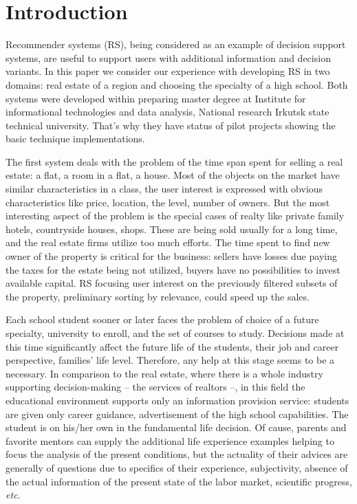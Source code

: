 \documentclass[conference]{IEEEtran}
\begin{document}
\section{Introduction}

Recommender systems (RS), being considered as an example of decision support systems, are useful to support users with additional information and decision variants.  In this paper we consider our experience with developing RS in two domains: real estate of a region and choosing the specialty of a high school.  Both systems were developed within preparing master degree at Institute for informational technologies and data analysis, National research Irkutsk state technical university.  That's why they have status of pilot projects showing the basic technique implementations.

The first system deals with the problem of the time span spent for selling a real estate: a flat, a room in a flat, a house.  Most of the objects on the market have similar characteristics in a class, the user interest is expressed with obvious characteristics like price, location, the level, number of owners.  But the most interesting aspect of the problem is the special cases of realty like private family hotels, countryside houses, shops.  These are being sold usually for a long time, and the real estate firms utilize too much efforts.  The time spent to find new owner of the property is critical for the business: sellers have losses due paying the taxes for the estate being not utilized, buyers have no possibilities to invest available capital.   RS focusing user interest on the previously filtered subsets of the property, preliminary sorting by relevance, could speed up the sales.

Each school student sooner or later faces the problem of choice of a future specialty, university to enroll, and the set of courses to study.  Decisions made at this time significantly affect the future life of the students, their job and career perspective, families' life level.  Therefore, any help at this stage seems to be a necessary. In comparison to the real estate, where there is a whole industry supporting decision-making -- the services of realtors --, in this field the educational environment supports only an information provision service: students are given only career guidance, advertisement of the high school capabilities.  The student is on his/her own in the fundamental life decision.  Of cause, parents and favorite mentors can supply the additional life experience examples helping to focus the analysis of the present conditions, but the actuality of their advices are generally of questions due to specifics of their experience, subjectivity, absence of the actual information of the present state of the labor market, scientific progress, \emph{etc}.
\end{document}
